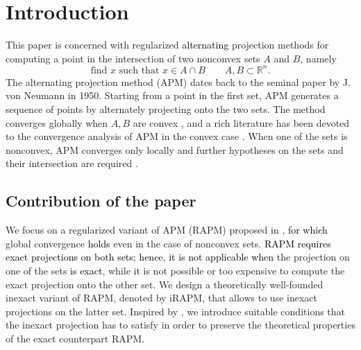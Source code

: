 \documentclass[pdflatex,sn-mathphys-num]{sn-jnl}
\numberwithin{equation}{section}%
\def\R{\mathbb{R}}
\newcommand{\REV}[1]{\textcolor{black}{#1}}
\theoremstyle{thmstyleone}%
\theoremstyle{thmstyletwo}%
\theoremstyle{thmstylethree}%
\begin{document}



\maketitle

\section{Introduction}

This paper is concerned with regularized \REV{alternating} projection methods for computing  a point in the intersection of two nonconvex sets $A$ and $B$, namely
\begin{equation}\label{eq:problem}
    \text{find }x\text{ such that }x\in A \cap B\quad\quad A,B \subset \R^n.
\end{equation}
The alternating projection method (APM) dates back to the seminal paper \cite{Neumann-etal-1950} by J. von Neumann in 1950. Starting from a point in the first set, APM generates a sequence of points by alternately projecting onto the two sets. The method converges globally when $A,B$ are convex \cite{bauschke1996projection}, and a rich literature has been devoted to the convergence analysis of APM in the convex case \cite{bauschke1993, bauschke1994, bauschke1996projection, escalanteraydan, santos2021}. When one of the sets is nonconvex, APM converges only locally and further hypotheses on the sets and their intersection are required \cite{drusvyatskiyPhDthesis2013,drusvyatskiy2015transversality,lewis2008alternating,lewis2009local,Noll-etal-2016}.

\subsection{Contribution of the paper}
We focus on a regularized variant of APM (RAPM) proposed in \cite{attouch2010proximal}, \REV{for which }
global convergence \REV{holds} even in the case of nonconvex sets. \REV{RAPM requires exact projections on both sets; hence, it is not applicable when} the projection on one of the sets \REV{is exact}, while it is not possible or too expensive to compute the exact projection onto the other set.  We design a theoretically well-founded inexact variant of RAPM, denoted by iRAPM, that allows to use inexact projections on the latter set. Inspired by \cite{Birgin2003,Ferreira-2022,Bonettini-Ochs-Prato-Rebegoldi-2023}, we introduce suitable conditions  that the inexact projection has to satisfy in order to preserve the theoretical properties of the exact counterpart RAPM. 
\end{document}
